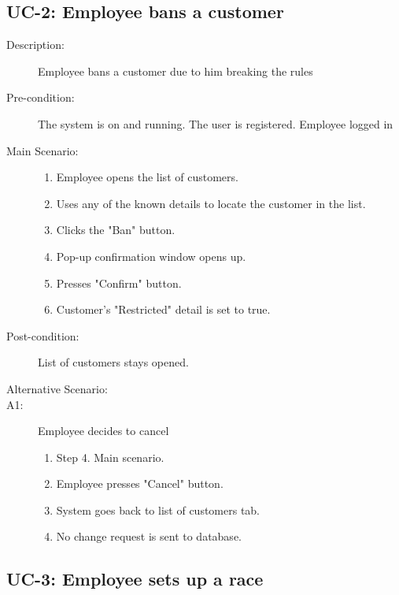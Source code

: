 \documentclass{article}
\begin{document}
\subsection{UC-2: Employee bans a customer}

\begin{description}
    \item[Description:] Employee bans a customer due to him breaking the rules
    \item[Pre-condition:] The system is on and running. The user is registered. Employee logged in
    \item[Main Scenario:] \hfill
    \begin{enumerate}
        \item Employee opens the list of customers.
        \item Uses any of the known details to locate the customer in the list.
        \item Clicks the "Ban" button.
        \item Pop-up confirmation window opens up.
        \item Presses "Confirm" button.
        \item Customer's "Restricted" detail is set to true.
    \end{enumerate}
    \item[Post-condition:] List of customers stays opened.
    \item[Alternative Scenario:] \hfill
    \item[A1:] Employee decides to cancel
    \begin{enumerate}
        \item Step 4. Main scenario.
        \item Employee presses "Cancel" button.
        \item System goes back to list of customers tab.
        \item No change request is sent to database.
    \end{enumerate}
\end{description}

\newpage

\subsection{UC-3: Employee sets up a race}
\end{document}
